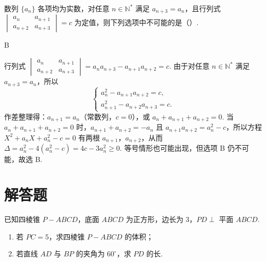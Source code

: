 \begin{problem}
数列 \(\{a_n\}\) 各项均为实数，对任意 \(n\in\mathbb N^*\) 满足 \(a_{n+3}=a_n\)，且行列式 \(\begin{vmatrix}a_n&a_{n+1}\\a_{n+2}&a_{n+3}\end{vmatrix}=c\) 为定值，则下列选项中不可能的是（\quad）.

\end{problem}

\begin{answer}
B
\end{answer}

\begin{solution}
行列式 \(\begin{vmatrix}a_n&a_{n+1}\\a_{n+2}&a_{n+3}\end{vmatrix}=a_na_{n+3}-a_{n+1}a_{n+2}=c\). 由于对任意 \(n\in\mathbb N^*\) 满足 \(a_{n+3}=a_n\)，所以
\[
\begin{cases}
a_n^2-a_{n+1}a_{n+2}=c,\\
a_{n+1}^2-a_{n+2}a_{n+3}=c.
\end{cases}
\]
作差整理得：\(a_{n+1}=a_n\)（常数列，\(c=0\)），或 \(a_n+a_{n+1}+a_{n+2}=0\). 当 \(a_n+a_{n+1}+a_{n+2}=0\) 时，\(a_{n+1}+a_{n+2}=-a_n\) 且 \(a_{n+1}a_{n+2}=a_n^2-c\)，所以方程 \(X^2+a_nX+a_n^2-c=0\) 有两根 \(a_{n+1}\)，\(a_{n+2}\)，从而 \(\Delta=a_n^2-4(a_n^2-c)=4c-3a_n^2\geqslant0\). 等号情形也可能出现，但选项 B 仍不可能，故选 B.
\end{solution}

\section{解答题}

\begin{problem}
已知四棱锥 \(P-ABCD\)，底面 \(ABCD\) 为正方形，边长为 \(3\)，\(PD\perp\) 平面 \(ABCD\).
\begin{enumerate}
\item 若 \(PC=5\)，求四棱锥 \(P-ABCD\) 的体积；
\item 若直线 \(AD\) 与 \(BP\) 的夹角为 \(60^\circ\)，求 \(PD\) 的长.
\end{enumerate}

\end{problem}

